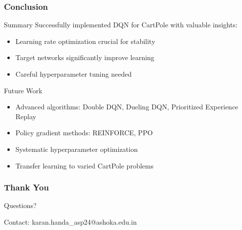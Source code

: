 \documentclass[
    9pt,
    aspectratio=169,
]{beamer}
\begin{document}
\begin{frame}
\frametitle{Conclusion}
\begin{block}{Summary}
    Successfully implemented DQN for CartPole with valuable insights:
    \begin{itemize}
        \item Learning rate optimization crucial for stability
        \item Target networks significantly improve learning
        \item Careful hyperparameter tuning needed
    \end{itemize}
\end{block}

\begin{block}{Future Work}
    \begin{itemize}
        \item Advanced algorithms: Double DQN, Dueling DQN, Prioritized Experience Replay
        \item Policy gradient methods: REINFORCE, PPO
        \item Systematic hyperparameter optimization
        \item Transfer learning to varied CartPole problems
    \end{itemize}
\end{block}
\end{frame}

\begin{frame}
\frametitle{Thank You}
\begin{center}
\Large Questions?

\bigskip
\normalsize
Contact: karan.handa\_asp24@ashoka.edu.in
\end{center}
\end{frame}
\end{document}

